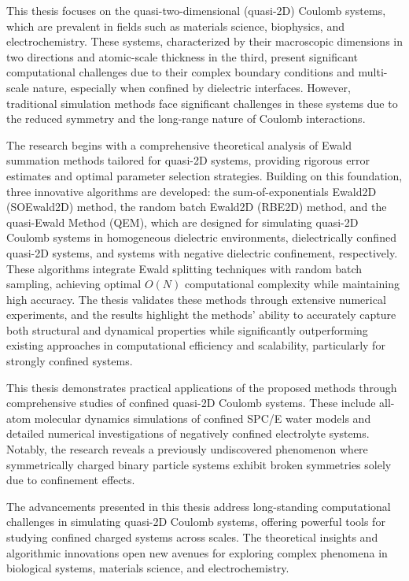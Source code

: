 This thesis focuses on the quasi-two-dimensional (quasi-2D) Coulomb systems, which are prevalent in fields such as materials science, biophysics, and electrochemistry. 
These systems, characterized by their macroscopic dimensions in two directions and atomic-scale thickness in the third, present significant computational challenges due to their complex boundary conditions and multi-scale nature, especially when confined by dielectric interfaces.
However, traditional simulation methods face significant challenges in these systems due to the reduced symmetry and the long-range nature of Coulomb interactions.

The research begins with a comprehensive theoretical analysis of Ewald summation methods tailored for quasi-2D systems, providing rigorous error estimates and optimal parameter selection strategies. 
Building on this foundation, three innovative algorithms are developed: the sum-of-exponentials Ewald2D (SOEwald2D) method, the random batch Ewald2D (RBE2D) method, and the quasi-Ewald Method (QEM), which are designed for simulating quasi-2D Coulomb systems in homogeneous dielectric environments, dielectrically confined quasi-2D systems, and systems with negative dielectric confinement, respectively.
These algorithms integrate Ewald splitting techniques with random batch sampling, achieving optimal $O(N)$ computational complexity while maintaining high accuracy. 
The thesis validates these methods through extensive numerical experiments, and the results highlight the methods' ability to accurately capture both structural and dynamical properties while significantly outperforming existing approaches in computational efficiency and scalability, particularly for strongly confined systems.

This thesis demonstrates practical applications of the proposed methods through comprehensive studies of confined quasi-2D Coulomb systems. 
These include all-atom molecular dynamics simulations of confined SPC/E water models and detailed numerical investigations of negatively confined electrolyte systems. 
Notably, the research reveals a previously undiscovered phenomenon where symmetrically charged binary particle systems exhibit broken symmetries solely due to confinement effects.

The advancements presented in this thesis address long-standing computational challenges in simulating quasi-2D Coulomb systems, offering powerful tools for studying confined charged systems across scales. 
The theoretical insights and algorithmic innovations open new avenues for exploring complex phenomena in biological systems, materials science, and electrochemistry.